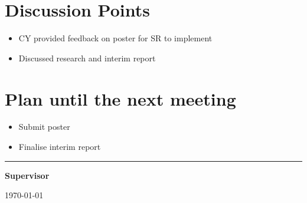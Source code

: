 \documentclass[12pt]{article}
\begin{document}
	\section{Discussion Points}
	\begin{itemize}
		\item CY provided feedback on poster for SR to implement
		\item Discussed research and interim report
	\end{itemize}
	\section{Plan until the next meeting}
	\begin{itemize}
		\item Submit poster
		\item Finalise interim report
	\end{itemize}
	\par
	\vspace{\fill}%
	\noindent\rule{0.4\linewidth}{0.5pt}%
	\vspace{1em}%
	\par
	\noindent\textbf{Supervisor}\vspace{1em}%
	\par
	\noindent\today
\end{document}
